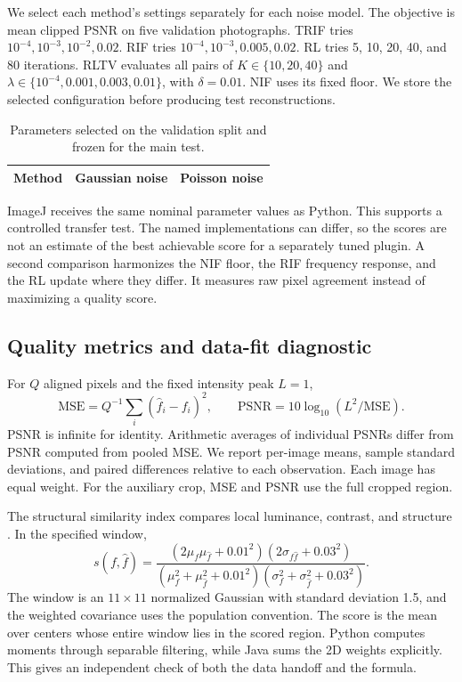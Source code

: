 We select each method's settings separately for each noise model. The objective is mean clipped PSNR on five validation photographs. TRIF tries \(10^{-4},10^{-3},10^{-2},0.02\). RIF tries \(10^{-4},10^{-3},0.005,0.02\). RL tries 5, 10, 20, 40, and 80 iterations. RLTV evaluates all pairs of \(K\in\{10,20,40\}\) and \(\lambda\in\{10^{-4},0.001,0.003,0.01\}\), with \(\delta=0.01\). NIF uses its fixed floor. We store the selected configuration before producing test reconstructions.

\begin{table}[!htbp]
\centering
\caption{Parameters selected on the validation split and frozen for the main test.}
\label{tab:settings}
\begin{tabular}{lcc}
\toprule Method & Gaussian noise & Poisson noise\\\midrule

\end{tabular}
\end{table}

ImageJ receives the same nominal parameter values as Python. This supports a controlled transfer test. The named implementations can differ, so the scores are not an estimate of the best achievable score for a separately tuned plugin. A second comparison harmonizes the NIF floor, the RIF frequency response, and the RL update where they differ. It measures raw pixel agreement instead of maximizing a quality score.

\subsection{Quality metrics and data-fit diagnostic}

For \(Q\) aligned pixels and the fixed intensity peak \(L=1\),
\begin{equation}
\mathrm{MSE} = Q^{-1}\sum_i(\widehat f_i-f_i)^2,\qquad
\mathrm{PSNR} = 10\log_{10}(L^2/\mathrm{MSE}) .
\end{equation}
PSNR is infinite for identity. Arithmetic averages of individual PSNRs differ from PSNR computed from pooled MSE. We report per-image means, sample standard deviations, and paired differences relative to each observation. Each image has equal weight. For the auxiliary crop, MSE and PSNR use the full cropped region.

The structural similarity index compares local luminance, contrast, and structure \citep{ssim}. In the specified window,
\begin{equation}
s(f,\widehat f)=
\frac{(2\mu_f\mu_{\widehat f}+0.01^2)(2\sigma_{f\widehat f}+0.03^2)}
{(\mu_f^2+\mu_{\widehat f}^2+0.01^2)(\sigma_f^2+\sigma_{\widehat f}^2+0.03^2)} .
\end{equation}
The window is an \(11\times11\) normalized Gaussian with standard deviation 1.5, and the weighted covariance uses the population convention. The score is the mean over centers whose entire window lies in the scored region. Python computes moments through separable filtering, while Java sums the 2D weights explicitly. This gives an independent check of both the data handoff and the formula.

